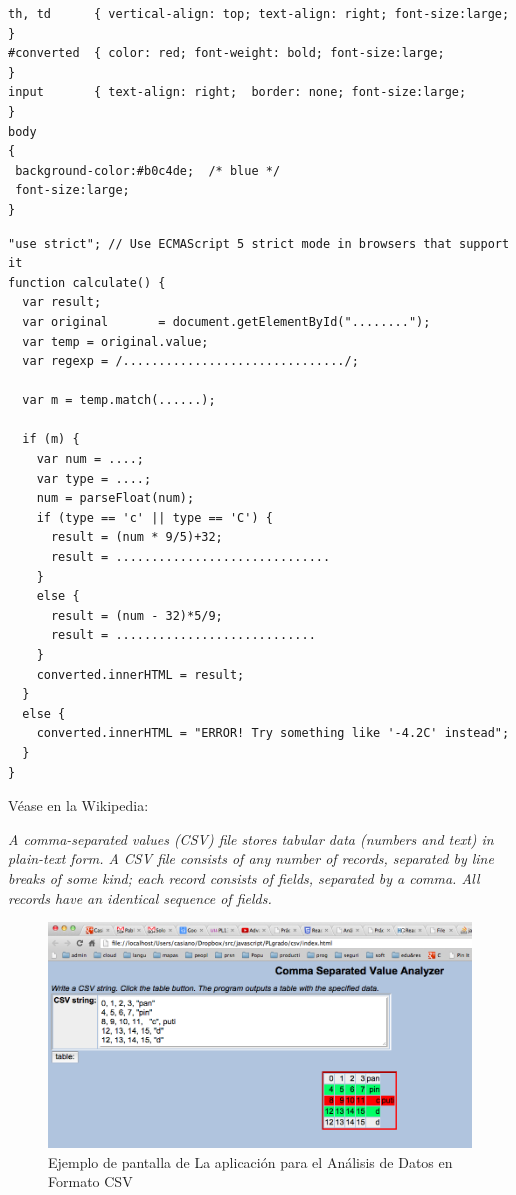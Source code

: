 \begin{verbatim}
th, td      { vertical-align: top; text-align: right; font-size:large; }     
#converted  { color: red; font-weight: bold; font-size:large;          }    
input       { text-align: right;  border: none; font-size:large;       }   
body
{
 background-color:#b0c4de;  /* blue */
 font-size:large;
}
\end{verbatim}

\begin{verbatim}
"use strict"; // Use ECMAScript 5 strict mode in browsers that support it
function calculate() {
  var result;
  var original       = document.getElementById("........");
  var temp = original.value;
  var regexp = /.............................../;
  
  var m = temp.match(......);
  
  if (m) {
    var num = ....;
    var type = ....;
    num = parseFloat(num);
    if (type == 'c' || type == 'C') {
      result = (num * 9/5)+32;
      result = ..............................
    }
    else {
      result = (num - 32)*5/9;
      result = ............................
    }
    converted.innerHTML = result;
  }
  else {
    converted.innerHTML = "ERROR! Try something like '-4.2C' instead";
  }
}
\end{verbatim}



Véase  en la Wikipedia:

{\it A comma-separated values (CSV) file stores tabular data (numbers
and text) in plain-text form. 
 A CSV file consists of any number of
records, separated by line breaks of some kind; each record consists
of fields, separated by a comma. All records have an identical
sequence of fields.}


\begin{figure}[htb]
\begin{center}
\includegraphics[scale=0.5]{chapter2/csv.png}
\end{center}
\label{figure:csv}
\caption{Ejemplo de pantalla de La aplicación para el Análisis de Datos en Formato CSV}
\end{figure}

